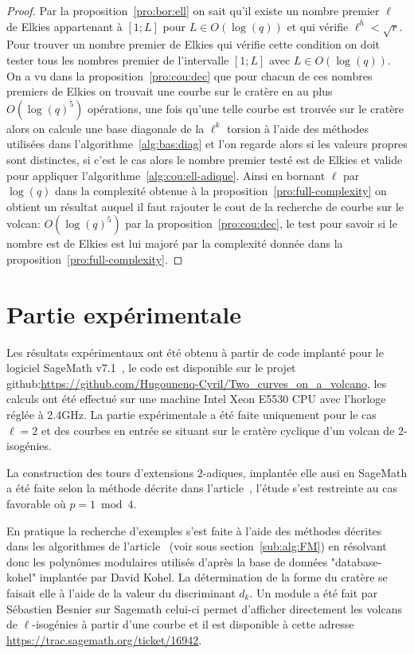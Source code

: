 \documentclass[10pt,a4paper]{book}
\theoremstyle{plain}
\theoremstyle{definition}
\theoremstyle{definition}
\theoremstyle{definition}
\theoremstyle{definition}
\theoremstyle{remark}
\theoremstyle{remark}
\theoremstyle{definition}
\begin{document}
\begin{proof}
Par la proposition~\ref{pro:bor:ell} on sait qu'il existe un nombre premier 
$\ell$ de Elkies appartenant à $[1;L]$ pour $L \in O(\log(q))$ et qui vérifie
$\ell^{h} < \sqrt{r}$. Pour trouver un nombre premier de Elkies qui vérifie 
cette condition on doit tester tous les nombres premier de l'intervalle $[1;L]$
avec $L \in O(\log(q))$. On a vu dans la proposition~\ref{pro:cou:dec} que pour 
chacun de ces nombres premiers de Elkies on trouvait une courbe sur le cratère
en au plus $O(\log(q)^5)$ opérations, une fois qu'une telle courbe est trouvée
sur le cratère alors on calcule une base diagonale de la $\ell^k$ torsion à 
l'aide des méthodes utilisées dans l'algorithme~\ref{alg:bas:diag} et l'on 
regarde alors si les valeurs propres sont distinctes, si c'est le cas alors le
nombre premier testé est de Elkies et valide pour appliquer 
l'algorithme~\ref{alg:cou:ell-adique}.
Ainsi en bornant $\ell$ par $\log(q)$ dans la complexité obtenue à la 
proposition~\ref{pro:full-complexity} on obtient un résultat auquel il faut 
rajouter le cout de la recherche de courbe sur le volcan: $O(\log(q)^5)$ par la 
proposition~\ref{pro:cou:dec}, le test pour savoir si le nombre est de Elkies 
est lui majoré par la complexité donnée dans la 
proposition~\ref{pro:full-complexity}.
\end{proof}

\section{Partie expérimentale}
\label{sec:exp:cou}

Les résultats expérimentaux ont été obtenu à partir de code implanté pour le 
logiciel SageMath v7.1~\cite{Sage}, le code est disponible sur le projet 
github:\url{https://github.com/Hugounenq-Cyril/Two_curves_on_a_volcano}, les 
calculs ont été effectué sur une machine Intel Xeon E5530 CPU avec l'horloge 
réglée à 2.4GHz. La partie expérimentale a été faite uniquement pour le cas 
$\ell=2$ et des courbes en entrée se situant sur le cratère cyclique d'un 
volcan de $2$-isogénies.

La construction des tours d'extensions $2$-adiques, implantée elle ausi en 
SageMath a été faite selon la méthode
décrite dans l'article~\cite{Doliskani-Schost15}, l'étude s'est restreinte au 
cas favorable où $p=1 \bmod 4$.

En pratique la recherche d'exemples s'est faite à l'aide des méthodes décrites
dans les algorithmes de l'article~\cite{FouquetMorain02} (voir sous section~\ref{sub:alg:FM}) en résolvant donc les
polynômes modulaires utilisés d'après la base de données "database-kohel" 
implantée par David Kohel. La détermination de la forme du cratère se faisait 
elle à l'aide de la valeur du discriminant $d_k$. Un module a été fait par 
Sébastien Besnier sur Sagemath celui-ci permet d'afficher directement les 
volcans de $\ell$-isogénies à partir d'une courbe et il est disponible à cette 
adresse \url{https://trac.sagemath.org/ticket/16942}. 
\end{document}
